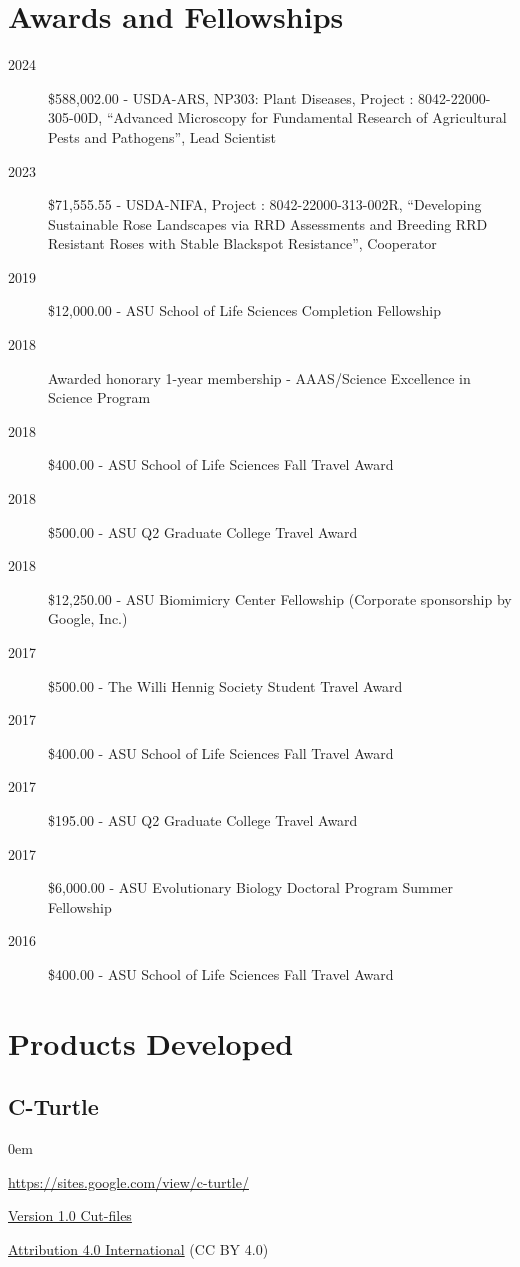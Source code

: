 \documentclass[12pt,a4paper]{article}
\begin{document}
\section*{Awards and Fellowships}
	\begin{description}
		\item [2024] \$588,002.00 - USDA-ARS, NP303: Plant Diseases, Project \textnumero: 8042-22000-305-00D, ``Advanced Microscopy for Fundamental Research of Agricultural Pests and Pathogens'', Lead Scientist
		\item [2023] \$71,555.55 - USDA-NIFA, Project \textnumero: 8042-22000-313-002R, ``Developing Sustainable Rose Landscapes via RRD Assessments and Breeding RRD Resistant Roses with Stable Blackspot Resistance'', Cooperator
		\item [2019] \$12,000.00 - ASU School of Life Sciences Completion Fellowship
		\item [2018] Awarded honorary 1-year membership - AAAS/Science Excellence in Science Program
		\item [2018] \$400.00 - ASU School of Life Sciences Fall Travel Award
		\item [2018] \$500.00 - ASU Q2 Graduate College Travel Award
		\item [2018] \$12,250.00 - ASU Biomimicry Center Fellowship (Corporate sponsorship by Google, Inc.)
		\item [2017] \$500.00 - The Willi Hennig Society Student Travel Award
		\item [2017] \$400.00 - ASU School of Life Sciences Fall Travel Award
		\item [2017] \$195.00 - ASU Q2 Graduate College Travel Award
		\item [2017] \$6,000.00 - ASU Evolutionary Biology Doctoral Program Summer Fellowship
		\item [2016] \$400.00 - ASU School of Life Sciences Fall Travel Award
	\end{description}

\section*{Products Developed}
	\subsection*{C-Turtle}
		\begin{description}
			\itemsep0em
			\item[Website] \href{https://sites.google.com/view/c-turtle/}{https://sites.google.com/view/c-turtle/}
			\item[Design] \href{https://drive.google.com/file/d/0BxntR7XVPIVqekR3Sjcyd1hkUm8/view}{Version 1.0 Cut-files}
			\item[License] \href{https://creativecommons.org/licenses/by/4.0/}{Attribution 4.0 International} (CC BY 4.0)
		\end{description}
\end{document}
